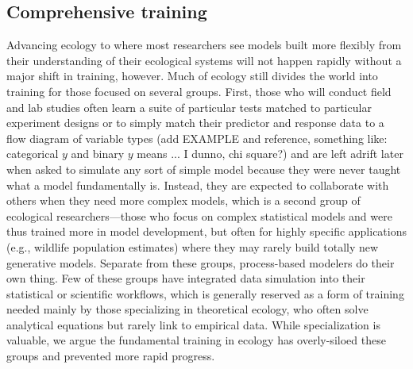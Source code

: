 \documentclass[11pt]{article}
\begin{document}
\subsection{Comprehensive training}
Advancing ecology to where most researchers see models built more flexibly from their understanding of their ecological systems will not happen rapidly without a major shift in training, however. Much of ecology still divides the world into training for those focused on several groups. First, those who will conduct field and lab studies often learn a suite of particular tests matched to particular experiment designs or to simply match their predictor and response data to a flow diagram of variable types (add EXAMPLE and reference, something like: categorical $y$ and binary $y$ means ... I dunno, chi square?) and are left adrift later when asked to simulate any sort of simple model because they were never taught what a model fundamentally is. Instead, they are expected to collaborate with others when they need more complex models, which is a second group of ecological researchers---those who focus on complex statistical models and were thus trained more in model development, but often for highly specific applications (e.g., wildlife population estimates) where they may rarely build totally new generative models. Separate from these groups, process-based modelers do their own thing. 
Few of these groups have integrated data simulation into their statistical or scientific workflows, which is generally reserved as a form of training needed mainly by those specializing in theoretical ecology, who often solve analytical equations but rarely link to empirical data. While specialization is valuable, we argue the fundamental training in ecology has overly-siloed these groups and prevented more rapid progress.
\end{document}
